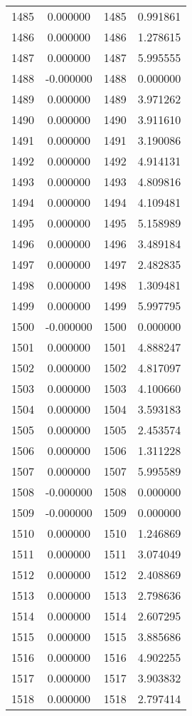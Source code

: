 \documentclass[12pt]{article}
\begin{document}
\begin{longtable}{@{}cccc@{}}
1485 & 0.000000 & 1485 & 0.991861 \\
1486 & 0.000000 & 1486 & 1.278615 \\
1487 & 0.000000 & 1487 & 5.995555 \\
1488 & -0.000000 & 1488 & 0.000000 \\
1489 & 0.000000 & 1489 & 3.971262 \\
1490 & 0.000000 & 1490 & 3.911610 \\
1491 & 0.000000 & 1491 & 3.190086 \\
1492 & 0.000000 & 1492 & 4.914131 \\
1493 & 0.000000 & 1493 & 4.809816 \\
1494 & 0.000000 & 1494 & 4.109481 \\
1495 & 0.000000 & 1495 & 5.158989 \\
1496 & 0.000000 & 1496 & 3.489184 \\
1497 & 0.000000 & 1497 & 2.482835 \\
1498 & 0.000000 & 1498 & 1.309481 \\
1499 & 0.000000 & 1499 & 5.997795 \\
1500 & -0.000000 & 1500 & 0.000000 \\
1501 & 0.000000 & 1501 & 4.888247 \\
1502 & 0.000000 & 1502 & 4.817097 \\
1503 & 0.000000 & 1503 & 4.100660 \\
1504 & 0.000000 & 1504 & 3.593183 \\
1505 & 0.000000 & 1505 & 2.453574 \\
1506 & 0.000000 & 1506 & 1.311228 \\
1507 & 0.000000 & 1507 & 5.995589 \\
1508 & -0.000000 & 1508 & 0.000000 \\
1509 & -0.000000 & 1509 & 0.000000 \\
1510 & 0.000000 & 1510 & 1.246869 \\
1511 & 0.000000 & 1511 & 3.074049 \\
1512 & 0.000000 & 1512 & 2.408869 \\
1513 & 0.000000 & 1513 & 2.798636 \\
1514 & 0.000000 & 1514 & 2.607295 \\
1515 & 0.000000 & 1515 & 3.885686 \\
1516 & 0.000000 & 1516 & 4.902255 \\
1517 & 0.000000 & 1517 & 3.903832 \\
1518 & 0.000000 & 1518 & 2.797414 \\

\end{longtable}
\end{document}
